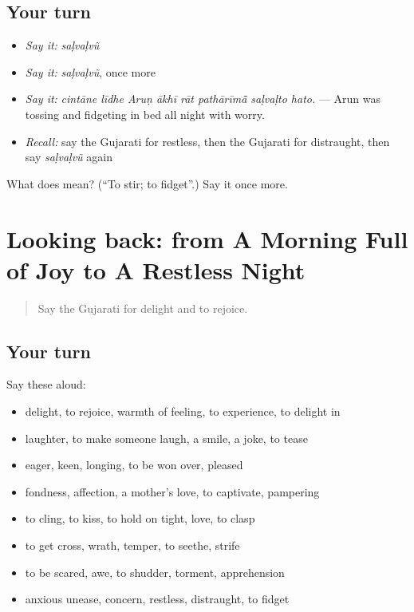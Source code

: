 \subsection*{Your turn}
\begin{itemize}
\raggedright
  \item \emph{Say it:} \emph{saḷvaḷvũ}
  \item \emph{Say it:} \emph{saḷvaḷvũ}, once more
  \item \emph{Say it:} \emph{cintāne līdhe Aruṇ ākhī rāt pathārīmā̃ saḷvaḷto hato.} — Arun was tossing and fidgeting in bed all night with worry.
  \item \emph{Recall:} say the Gujarati for restless, then the Gujarati for distraught, then say \emph{saḷvaḷvũ} again
\end{itemize}

\begin{tcolorbox}[breakable,colback=teal!4,colframe=teal!35!black,title={Before you move on}]
What does  mean? (\textquotedblleft{}To stir; to fidget\textquotedblright{}.) Say it once more.
\end{tcolorbox}
\section[(dialogue)]{Looking back: from A Morning Full of Joy to A Restless Night}

\label{lesson:GU-R454-review-447-454}



\begin{quote}
Say the Gujarati for delight and to rejoice.
\end{quote}

\subsection*{Your turn}
Say these aloud:

\begin{itemize}
\raggedright
  \item delight, to rejoice, warmth of feeling, to experience, to delight in
  \item laughter, to make someone laugh, a smile, a joke, to tease
  \item eager, keen, longing, to be won over, pleased
  \item fondness, affection, a mother's love, to captivate, pampering
  \item to cling, to kiss, to hold on tight, love, to clasp
  \item to get cross, wrath, temper, to seethe, strife
  \item to be scared, awe, to shudder, torment, apprehension
  \item anxious unease, concern, restless, distraught, to fidget
\end{itemize}

